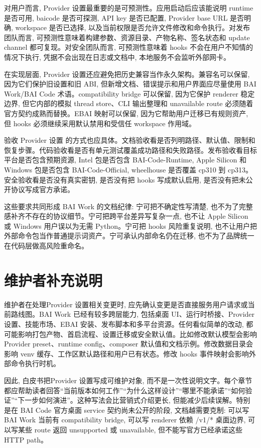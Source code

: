 对用户而言, Provider 设置最重要的是可预测性。应用启动后应该能说明 runtime 是否可用, baicode 是否可探测, API key 是否已配置, Provider base URL 是否明确, workspace 是否已选择, 以及当前权限是否允许文件修改和命令执行。对发布团队而言, 可预测性意味着构建参数、资源目录、产物名称、签名状态和 update channel 都可复现。对安全团队而言, 可预测性意味着 hooks 不会在用户不知情的情况下执行, 凭据不会出现在日志或文档中, 本地服务不会监听外部网卡。

在实现层面, Provider 设置还应避免把历史兼容当作永久架构。兼容名可以保留, 因为它们保护旧设置和旧 ABI, 但新增文档、错误提示和用户界面应尽量使用 BAI Work/BAI Code 术语。compatibility bridge 可以保留, 因为它保护 renderer 稳定边界, 但它内部的模拟 thread store、CLI 输出整理和 unavailable route 必须随着官方契约成熟而替换。EBAI 映射可以保留, 因为它帮助用户迁移已有规则资产, 但 hooks 必须继续采用默认禁用和受信任 workspace 作用域。

验收 Provider 设置 的方式也应具体。文档验收看是否列明路径、默认值、限制和恢复步骤。代码验收看是否有单元测试覆盖成功路径和失败路径。发布验收看目标平台是否包含预期资源, Intel 包是否包含 BAI-Code-Runtime, Apple Silicon 和 Windows 包是否包含 BAI-Code-Official, wheelhouse 是否覆盖 cp310 到 cp313。安全验收看是否没有真实密钥, 是否没有把 hooks 写成默认启用, 是否没有把未公开协议写成官方承诺。

这些要求共同形成 BAI Work 的文档纪律: 宁可把不确定性写清楚, 也不为了完整感补齐不存在的协议细节。宁可把跨平台差异写复杂一点, 也不让 Apple Silicon 或 Windows 用户误以为无需 Python。宁可把 hooks 风险重复说明, 也不让用户把外部命令包当作普通提示词资产。宁可承认内部命名仍在迁移, 也不为了品牌统一在代码层做高风险重命名。

\section{维护者补充说明}

维护者在处理Provider 设置相关变更时, 应先确认变更是否直接服务用户请求或当前路线图。BAI Work 已经有较多跨层能力, 包括桌面 UI、运行时桥接、Provider 设置、技能市场、EBAI 安装、发布脚本和多平台资源。任何看似简单的改动, 都可能影响打包产物、首启流程、设置迁移或安全默认值。比如修改默认模型会影响 Provider preset、runtime config、composer 默认值和文档示例。修改数据目录会影响 venv 缓存、工作区默认路径和用户已有状态。修改 hooks 事件映射会影响外部命令执行时机。

因此, 白皮书把Provider 设置写成可维护对象, 而不是一次性说明文字。每个章节都应帮助读者回答“当前版本如何工作”“为什么这样设计”“哪里不能承诺”“如何验证”“下一步如何演进”。这种写法会比营销式介绍更长, 但能减少后续误解。特别是在 BAI Code 官方桌面 service 契约尚未公开的阶段, 文档越需要克制: 可以写 BAI Work 当前有 compatibility bridge, 可以写 renderer 依赖 /v1/* 桌面边界, 可以写某些 route 返回 unsupported 或 unavailable, 但不能写官方已经承诺这些 HTTP path。

